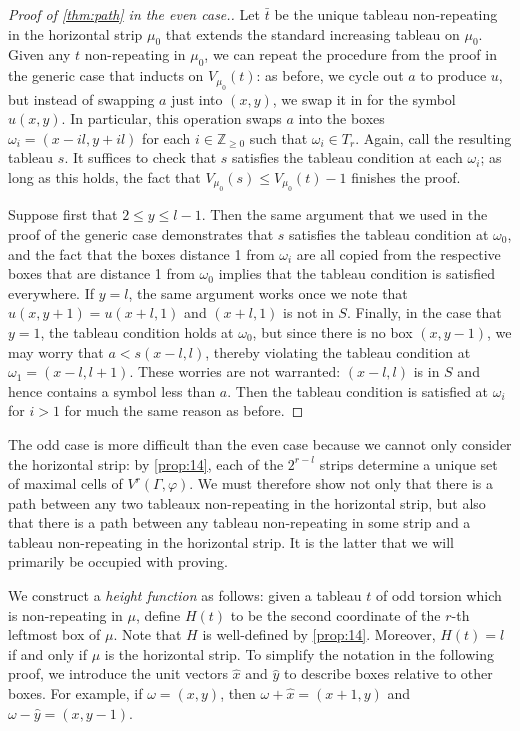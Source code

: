 \documentclass[11pt,reqno]{amsart}
\newcommand*{\Z}{\mathbb{Z}}
\theoremstyle{definition}
\theoremstyle{problem}
\theoremstyle{plain}
\theoremstyle{remark}
\theoremstyle{theorem}
\numberwithin{equation}{section}
\numberwithin{figure}{section}
\theoremstyle{definition}
\theoremstyle{problem}
\theoremstyle{plain}
\begin{document}
\begin{proof}[Proof of \cref{thm:path} in the even case.]
  Let $\bar{t}$ be the unique tableau non-repeating in the horizontal
  strip $\mu_0$ that extends the standard increasing tableau on
  $\mu_0$.  Given any $t$ non-repeating in $\mu_0$, we can repeat the
  procedure from the proof in the generic case that inducts on
  $V_{\mu_0}(t)$: as before, we cycle out $a$ to produce $u$, but
  instead of swapping $a$ just into $(x,y)$, we swap it in for the
  symbol $u(x,y)$.  In particular, this operation swaps $a$ into the
  boxes $\omega_i = (x-il,y+il)$ for each $i \in \Z_{\geq 0}$ such
  that $\omega_i \in T_r$.  Again, call the resulting tableau $s$.  It
  suffices to check that $s$ satisfies the tableau condition at each
  $\omega_i$; as long as this holds, the fact that
  $V_{\mu_0}(s) \leq V_{\mu_0}(t) - 1$ finishes the proof.

  Suppose first that $2 \leq y \leq l-1$.  Then the same argument that
  we used in the proof of the generic case demonstrates that $s$
  satisfies the tableau condition at $\omega_0$, and the fact that the
  boxes distance 1 from $\omega_i$ are all copied from the respective
  boxes that are distance 1 from $\omega_0$ implies that the tableau
  condition is satisfied everywhere.  If $y = l$, the same argument
  works once we note that $u(x,y+1) = u(x+l,1)$ and $(x+l,1)$ is not
  in $S$.  Finally, in the case that $y = 1$, the tableau condition
  holds at $\omega_0$, but since there is no box $(x,y-1)$, we may
  worry that $a < s(x-l,l)$, thereby violating the tableau condition
  at $\omega_1 = (x-l,l+1)$.  These worries are not warranted:
  $(x-l,l)$ is in $S$ and hence contains a symbol less than $a$.  Then
  the tableau condition is satisfied at $\omega_i$ for $i > 1$ for
  much the same reason as before.
\end{proof}

The odd case is more difficult than the even case because we cannot
only consider the horizontal strip: by \cref{prop:14}, each of the
$2^{r-l}$ strips determine a unique set of maximal cells of
$V^r(\Gamma,\varphi)$.  We must therefore show not only that there is
a path between any two tableaux non-repeating in the horizontal strip,
but also that there is a path between any tableau non-repeating in some
strip and a tableau non-repeating in the horizontal strip.  It is the
latter that we will primarily be occupied with proving.

We construct a \textit{height function} as follows: given a tableau
$t$ of odd torsion which is non-repeating in $\mu$, define $H(t)$ to
be the second coordinate of the $r$-th leftmost box of $\mu$.  Note
that $H$ is well-defined by \cref{prop:14}.  Moreover, $H(t) = l$ if
and only if $\mu$ is the horizontal strip. 
To simplify the notation in the following proof, we introduce the unit
vectors $\hat x$ and $\hat y$ to describe boxes relative to other
boxes.  For example, if $\omega = (x,y)$, then
$\omega + \hat x = (x+1,y)$ and $\omega - \hat y = (x,y-1)$.
\end{document}
